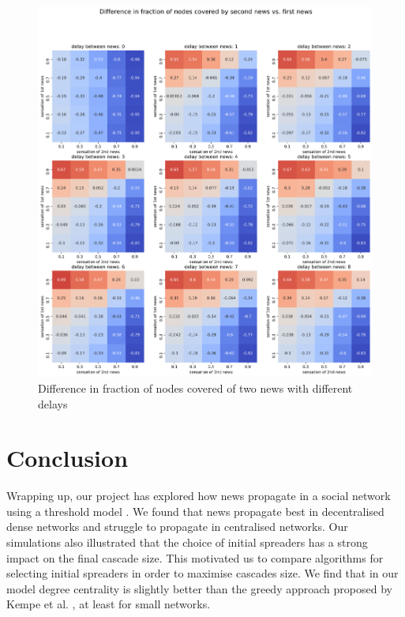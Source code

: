 \documentclass[10pt]{article}
\begin{document}
\begin{figure}[h!]
\centering
\includegraphics[width=1.0\linewidth]{images/two_news_delays_no_decay.png}
\caption{Difference in fraction of nodes covered of two news with different delays}
\label{fig:two_news_delays_no_decay}
\end{figure}
 
\section{Conclusion}
Wrapping up, our project has explored how news propagate in a social network using a threshold model \cite{watts2002simple}. We found that news propagate best in decentralised dense networks and struggle to propagate in centralised networks. Our simulations also illustrated that the choice of initial spreaders has a strong impact on the final cascade size. This motivated us to compare algorithms for selecting initial spreaders in order to maximise cascades size. We find that in our model degree centrality is slightly better than the greedy approach proposed by Kempe et al. \cite{kempe2003maximizing}, at least for small networks. \\
\end{document}
